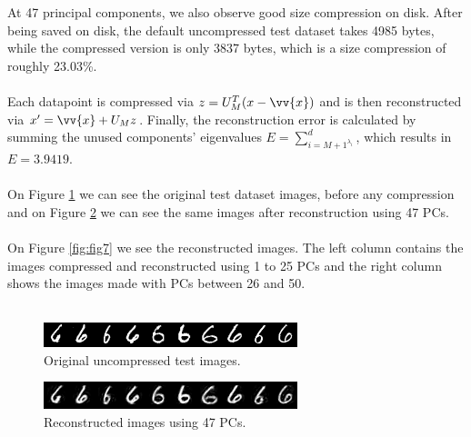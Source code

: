 \documentclass[a4paper,11pt,twocolumn]{article}
\begin{document}
At 47 principal components, we also observe good size compression on disk. After being saved on disk, the default uncompressed test dataset takes 4985 bytes, while the compressed version is only 3837 bytes, which is a size compression of roughly 23.03\%.
\\\\Each datapoint is compressed via $z = U^{T}_{M}(x - \vv{x})$ and is then reconstructed via $x' = \vv{x} + U_{M}z$.
Finally, the reconstruction error is calculated by summing the unused components' eigenvalues $E = \sum_{i=M+1^{\lambda_{i}}}^{d}$, which results in $E = 3.9419$.
\\\\On Figure \ref{fig:fig5} we can see the original test dataset images, before any compression and on Figure \ref{fig:fig6} we can see the same images after reconstruction using 47 PCs.
\\\\On Figure \ref{fig:fig7} we see the reconstructed images. The left column contains the images compressed and reconstructed using 1 to 25 PCs and the right column shows the images made with PCs between 26 and 50.\\\\ 

\begin{figure}[!h]
  \centering
  \includegraphics[width=\linewidth]{img/original.png}
  \caption{Original uncompressed test images.}
  \label{fig:fig5}
\end{figure}

\begin{figure}[!h]
  \centering
  \includegraphics[width=\linewidth]{img/47pcs.png}
  \caption{Reconstructed images using 47 PCs.}
  \label{fig:fig6}
\end{figure}
\end{document}
